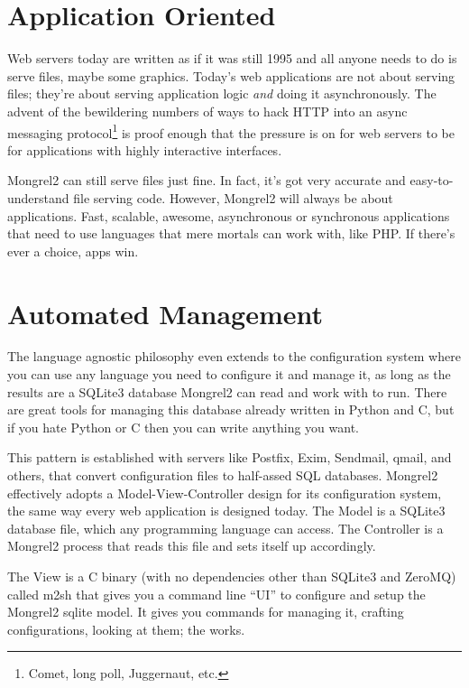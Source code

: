 \section{Application Oriented}

Web servers today are written as if it was still 1995 and all anyone needs to do
is serve files, maybe some graphics.  Today's web applications are not about serving
files; they're about serving application logic \emph{and} doing it asynchronously.
The advent of the bewildering numbers of ways to hack HTTP into an async messaging
protocol\footnote{Comet, long poll, Juggernaut, etc.} is proof enough that the
pressure is on for web servers to be for applications with highly interactive
interfaces.

Mongrel2 can still serve files just fine.  In fact, it's got very accurate and
easy-to-understand file serving code.  However, Mongrel2 will always be about applications.
Fast, scalable, awesome, asynchronous or synchronous applications that need to use languages
that mere mortals can work with, like PHP\@. If there's ever a choice, apps win.

\section{Automated Management}

The language agnostic philosophy even extends to the configuration system where
you can use any language you need to configure it and manage it, as long as the
results are a SQLite3 database Mongrel2 can read and work with to run.  There
are great tools for managing this database already written in Python and C, but
if you hate Python or C then you can write anything you want.

This pattern is established with servers like Postfix, Exim, Sendmail, qmail,
and others, that convert configuration files to half-assed SQL databases.
Mongrel2 effectively adopts a Model-View-Controller design for its
configuration system, the same way every web application is designed today.
The Model is a SQLite3 database file, which any programming language can access.
The Controller is a Mongrel2 process that reads this file and sets itself up
accordingly.

The View is a C binary (with no dependencies other than SQLite3 and ZeroMQ)
called m2sh that gives you a command line ``UI'' to configure and setup the
Mongrel2 sqlite model.  It gives you commands for managing it, crafting
configurations, looking at them; the works.

